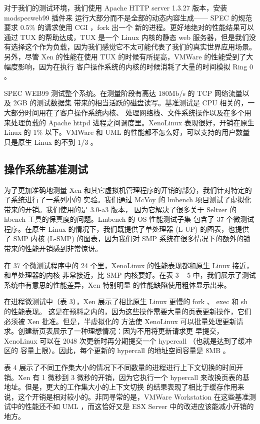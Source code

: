 对于我们的测试环境，我们使用 Apache HTTP server 1.3.27 版本，安装 modspecweb99 插件来
运行大部分而不是全部的动态内容生成—— SPEC 的规范要求 0.5\% 的请求使用 CGI ，fork 出一个
新的进程。更好地绝对的性能结果可以通过 TUX 的帮助达成，TUX 是一个 Linux 内核的静态 web
服务器，但是我们没有选择这个作为负载，因为我们感觉它不太可能代表了我们的真实世界应用场景。
另外，尽管 Xen 的性能在使用 TUX 的时候有所提高，VMWare 的性能受到了大幅度影响，因为在执行
客户操作系统的内核的时候消耗了大量的时间模拟 Ring 0 。

SPEC WEB99 测试整个系统。在测量阶段有高达 180Mb/s 的 TCP 网络流量以及 2GB 的测试数据集
带来的相当活跃的磁盘读写。基准测试是 CPU 相关的，一大部分时间用在了客户操作系统内核、
处理网络栈、文件系统操作以及在多个用来处理负载的 Apache httpd 进程之间调度里。XenoLinux
表现很好，开销在原生 Linux 的 1\% 以下。VMWare 和 UML 的性能都不怎么好，可以支持的用户数量
只是原生 Linux 的不到 1/3 。

\subsection{操作系统基准测试}

为了更加准确地测量 Xen 和其它虚拟机管理程序的开销的部分，我们针对特定的子系统进行了一系列小的
实验。我们通过 McVoy 的 lmbench 项目测试了虚拟化带来的开销。我们使用的是 3.0-a3 版本，
因为它解决了很多关于 Seltzer 的 hbench 工具的保真度的问题。Lmbench 的 OS 性能测试子集
包含了 37 个微测试程序。在原生 Linux 的情况下，我们既提供了单处理器 (L-UP) 的图表，也提供了
SMP 内核 (L-SMP) 的图表，因为我们对 SMP 系统在很多情况下的额外的锁带来的性能开销感到非常惊讶。

在 37 个微测试程序中的 24 个里，XenoLinux 的性能表现都和原生 Linux 接近，和单处理器的内核
非常接近，比 SMP 内核要好。在表 3 ~ 5 中，我们展示了测试系统中有意思的性能差异，Xen 特别明显
的性能缺陷使用粗体显示出来。

在进程微测试中（表 3），Xen 展示了相比原生 Linux 更慢的 fork 、 exec 和 sh 的性能表现。
这是在预料之内的，因为这些操作需要大量的页表更新操作，它们必须被 Xen 批准。但是，半虚拟化的
方法使 XenoLinux 可以批量处理更新请求。创建新页表展示了一种理想情况：因为不用将更新请求更
早提交，XenoLinux 可以在 2048 次更新时再分期提交一个 hypercall （也就是达到了缓冲区的
容量上限）。因此，每个更新的 hypercall 的地址空间容量是 8MB 。

表 4 展示了不同工作集大小的情况下不同数量的进程进行上下文切换的时间开销。Xen 有 1 微秒到 3
微秒的开销，因为它执行一个 hypercall 来改换页表的基地址。但是，更大的工作集大小的上下文切换
的结果表现了相比于缓存作用来说，这个开销是相对较小的。非同寻常的是，VMWare Workstation
在这些基准测试中的性能还不如 UML ，而这恰好又是 ESX Server 中的改进应该能减小开销的地方。

